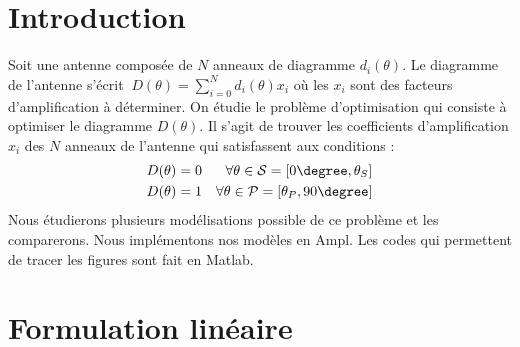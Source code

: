 \section*{Introduction}
Soit une antenne composée de $N$ anneaux de diagramme $d_i(\theta)$. Le diagramme de l'antenne s'écrit $\
D(\theta) = \sum_{i=0}^N d_i(\theta) x_i$ où les $x_i$ sont des facteurs d'amplification à déterminer. On étudie le problème d'optimisation qui consiste à optimiser le diagramme $D(\theta)$. Il s'agit de trouver les coefficients d'amplification $x_i$ des $N$ anneaux de l'antenne qui satisfassent aux conditions : 
\begin{align*}
D(\theta) &= 0  &\forall \theta \in \mathcal{S}=[0 \degree,\theta_S]\\
D(\theta) &= 1 &\forall \theta \in \mathcal{P}=[\theta_P, 90\degree]
\end{align*}
Nous étudierons plusieurs modélisations possible de ce problème et les comparerons. Nous implémentons nos modèles en Ampl. Les codes qui permettent de tracer les figures sont fait en Matlab.


\newpage
\section{Formulation linéaire}
